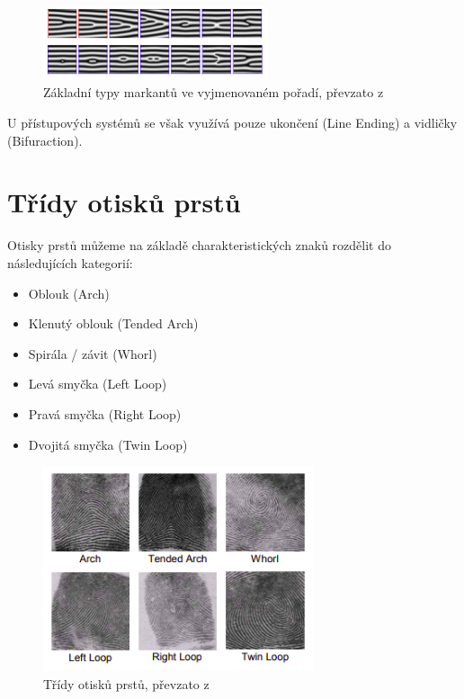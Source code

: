 \begin{figure}[htbp]
    \centering
    \includegraphics[width=250]{obrazky-figures/markants.png}
    \caption{Základní typy markantů ve vyjmenovaném pořadí, převzato z \cite{Drahansky}}
    \label{fig:markants}
\end{figure}

U přístupových systémů se však využívá pouze ukončení (Line Ending) a vidličky (Bifuraction).\cite{Drahansky}

\section{Třídy otisků prstů}
Otisky prstů můžeme na základě charakteristických znaků rozdělit do následujících kategorií:\cite{Drahansky}
\begin{itemize}
    \item Oblouk (Arch)
    \item Klenutý oblouk (Tended Arch)
    \item Spirála / závit (Whorl)
    \item Levá smyčka (Left Loop)
    \item Pravá smyčka (Right Loop)
    \item Dvojitá smyčka (Twin Loop)
\end{itemize}

\begin{figure}[htbp]
    \centering
    \includegraphics[width=300]{obrazky-figures/classes.png}
    \caption{Třídy otisků prstů, převzato z \cite{Drahansky}}
    \label{fig:classes}
\end{figure}

